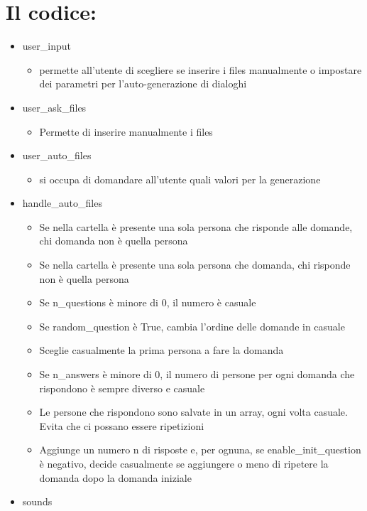 \documentclass[
]{article}
\providecommand{\tightlist}{%
  \setlength{\itemsep}{0pt}\setlength{\parskip}{0pt}}
\begin{document}
\section{Il codice:}\label{il-codice}

\begin{itemize}
\tightlist
\item
  user\_input

  \begin{itemize}
  \tightlist
  \item
    permette all'utente di scegliere se inserire i files manualmente o impostare dei parametri per l'auto-generazione di dialoghi
  \end{itemize}
\item
  user\_ask\_files

  \begin{itemize}
  \tightlist
  \item
    Permette di inserire manualmente i files
  \end{itemize}
\item
  user\_auto\_files

  \begin{itemize}
  \tightlist
  \item
    si occupa di domandare all'utente quali valori per la generazione
  \end{itemize}
\item
  handle\_auto\_files

  \begin{itemize}
  \tightlist
  \item
    Se nella cartella è presente una sola persona che risponde alle domande, chi domanda non è quella persona
  \item
    Se nella cartella è presente una sola persona che domanda, chi risponde non è quella persona
  \item
    Se n\_questions è minore di 0, il numero è casuale
  \item
    Se random\_question è True, cambia l'ordine delle domande in casuale
  \item
    Sceglie casualmente la prima persona a fare la domanda
  \item
    Se n\_answers è minore di 0, il numero di persone per ogni domanda che rispondono è sempre diverso e casuale
  \item
    Le persone che rispondono sono salvate in un array, ogni volta casuale. Evita che ci possano essere ripetizioni
  \item
    Aggiunge un numero n di risposte e, per ognuna, se enable\_init\_question è negativo, decide casualmente se aggiungere o meno di ripetere la domanda dopo la domanda iniziale
  \end{itemize}
\item
  sounds


\end{itemize}
\end{document}
